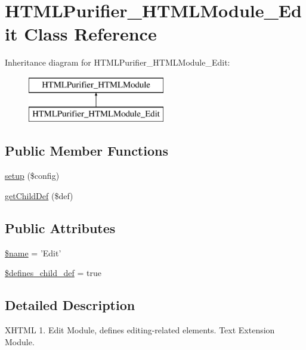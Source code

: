 \hypertarget{classHTMLPurifier__HTMLModule__Edit}{\section{H\+T\+M\+L\+Purifier\+\_\+\+H\+T\+M\+L\+Module\+\_\+\+Edit Class Reference}
\label{classHTMLPurifier__HTMLModule__Edit}
}
Inheritance diagram for H\+T\+M\+L\+Purifier\+\_\+\+H\+T\+M\+L\+Module\+\_\+\+Edit\+:\begin{figure}[H]
\begin{center}
\leavevmode
\includegraphics[height=2.000000cm]{classHTMLPurifier__HTMLModule__Edit}
\end{center}
\end{figure}
\subsection*{Public Member Functions}
\begin{DoxyCompactItemize}
\item 
\hyperlink{classHTMLPurifier__HTMLModule__Edit_a7cde7907a99b4faad7e6705e9a556d33}{setup} (\$config)
\item 
\hyperlink{classHTMLPurifier__HTMLModule__Edit_a1280b16a072e9346000aeb7b7e121d5e}{get\+Child\+Def} (\$def)
\end{DoxyCompactItemize}
\subsection*{Public Attributes}
\begin{DoxyCompactItemize}
\item 
\hyperlink{classHTMLPurifier__HTMLModule__Edit_af83c8d17bfeaa663ed916d473d14b13e}{\$name} = 'Edit'
\item 
\hyperlink{classHTMLPurifier__HTMLModule__Edit_abaf9668647fcc2e4870d2b354a60d6d5}{\$defines\+\_\+child\+\_\+def} = true
\end{DoxyCompactItemize}


\subsection{Detailed Description}
X\+H\+T\+M\+L 1. Edit Module, defines editing-\/related elements. Text Extension Module. 

